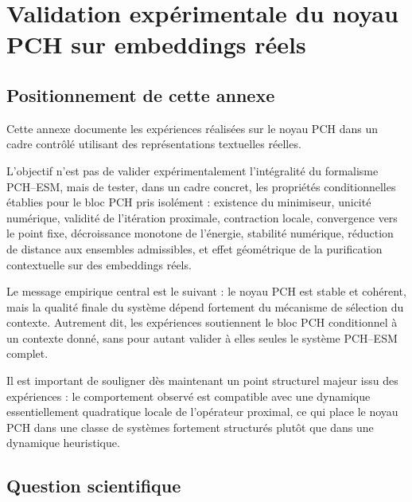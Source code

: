\documentclass[11pt,a4paper]{article}
\newcommand{\1}{\mathbf 1}
\begin{document}


\appendix

\section{Validation expérimentale du noyau PCH sur embeddings réels}

\subsection{Positionnement de cette annexe}

Cette annexe documente les expériences réalisées sur le noyau PCH dans un cadre contrôlé utilisant des représentations textuelles réelles.

L’objectif n’est pas de valider expérimentalement l’intégralité du formalisme PCH--ESM, mais de tester, dans un cadre concret, les propriétés conditionnelles établies pour le bloc PCH pris isolément : existence du minimiseur, unicité numérique, validité de l’itération proximale, contraction locale, convergence vers le point fixe, décroissance monotone de l’énergie, stabilité numérique, réduction de distance aux ensembles admissibles, et effet géométrique de la purification contextuelle sur des embeddings réels.

Le message empirique central est le suivant : le noyau PCH est stable et cohérent, mais la qualité finale du système dépend fortement du mécanisme de sélection du contexte. Autrement dit, les expériences soutiennent le bloc PCH conditionnel à un contexte donné, sans pour autant valider à elles seules le système PCH--ESM complet.

Il est important de souligner dès maintenant un point structurel majeur issu des expériences : le comportement observé est compatible avec une dynamique essentiellement quadratique locale de l’opérateur proximal, ce qui place le noyau PCH dans une classe de systèmes fortement structurés plutôt que dans une dynamique heuristique.

\subsection{Question scientifique}
\end{document}
